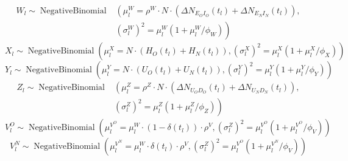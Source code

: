 \begin{equation}
\begin{aligned}
W_l \sim \operatorname{Negative Binomial} & \left( \mu^{W}_l = \rho^W \cdot N \cdot \left( \Delta N_{E_O I_O} \left( t_l \right) + \Delta N_{E_N I_N} \left( t_l \right) \right) \right.,\\
& \left. \left(\sigma^W_l\right)^{2} = \mu^{W}_l \left( 1 + \mu^{W}_l / \phi_W \right) \right)
\end{aligned}
\label{ch_5:eqn:case_emission_simulation}
\end{equation}
\begin{equation}
X_l \sim \operatorname{Negative Binomial} \left( \mu^{X}_l = N \cdot \left( H_O \left( t_l \right) + H_N \left( t_l \right) \right), \left(\sigma^X_l\right)^{2} = \mu^{X}_l \left( 1 + \mu^{X}_l / \phi_X \right) \right)
\label{ch_5:eqn:hosp_emission_simulation}
\end{equation}
\begin{equation}
Y_l \sim \operatorname{Negative Binomial} \left( \mu^{Y}_l = N \cdot \left( U_O \left( t_l \right) + U_N \left( t_l \right) \right), \left(\sigma^Y_l\right)^{2} = \mu^{Y}_l \left( 1 + \mu^{Y}_l / \phi_Y \right) \right)
\label{ch_5:eqn:icu_emission_simulation}
\end{equation}
\begin{equation}
\begin{aligned}
Z_l \sim \operatorname{Negative Binomial} & \left( \mu^{Z}_l = \rho^Z \cdot N \cdot \left(\Delta N_{U_O D_O} \left( t_l \right) + \Delta N_{U_N D_N} \left( t_l \right) \right),\right. \\
& \left. \left(\sigma^Z_l\right)^{2} = \mu^{Z}_l \left( 1 + \mu^{Z}_l / \phi_Z \right) \right)
\label{ch_5:eqn:death_emission_simulation}
\end{aligned}
\end{equation}
\begin{equation}
    V^O_l \sim \operatorname{Negative Binomial} \left( \mu^{V^O}_l = \mu^{W}_l \cdot \left( 1 - \delta\left(t_l\right)\right) \cdot \rho^V , \left(\sigma^Z_l\right)^{2} = \mu^{V^O}_l \left( 1 + \mu^{V^O}_l / \phi_V \right) \right)
\label{ch_5:eqn:old_variant_emission_simulation}
\end{equation}
\begin{equation}
    V^N_l \sim \operatorname{Negative Binomial} \left( \mu^{V^N}_l = \mu^{W}_l \cdot \delta\left(t_l\right) \cdot \rho^V , \left(\sigma^Z_l\right)^{2} = \mu^{V^O}_l \left( 1 + \mu^{V^N}_l / \phi_V \right) \right)
\label{ch_5:eqn:new_variant_emission_simulation}
\end{equation}

